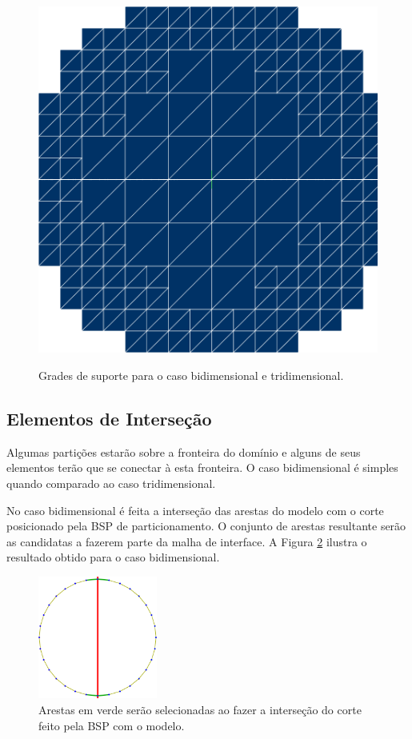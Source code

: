 \begin{figure}[!ht]
{     		\begin{minipage}[c]{0.4\textwidth}{\includegraphics[width=\textwidth]{fig/esfera3_grade.png}}\end{minipage}
     	}    
     	\caption{Grades de suporte para o caso bidimensional e tridimensional.}
     	\label{fig:grades_modelos}
     \end{figure}
     
        
\subsection{Elementos de Interseção}

Algumas partições estarão sobre a fronteira do domínio e alguns de seus elementos terão que se conectar à esta fronteira. O caso bidimensional é simples quando comparado ao caso tridimensional.

No caso bidimensional é feita a interseção das arestas do modelo com o corte posicionado pela BSP de particionamento. O conjunto de arestas resultante serão as candidatas a fazerem parte da malha de interface. A Figura \ref{fig:circulo_arestas} ilustra o resultado obtido para o caso bidimensional.


\begin{figure}[!ht]
	\centering
	\includegraphics[width=0.35\textwidth]{fig/circulo2_arestas.png}
	\caption{Arestas em verde serão selecionadas ao fazer a interseção do corte feito pela BSP com o modelo.}
	\label{fig:circulo_arestas}
\end{figure}


